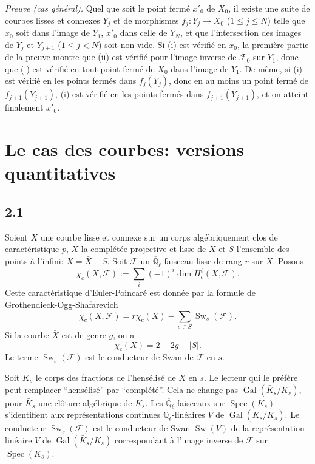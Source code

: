 \documentclass[11pt,a4paper]{article}
\theoremstyle{plain}
\theoremstyle{definition}
\DeclareMathOperator{\Spec}{Spec}
\DeclareMathOperator{\Gal}{Gal}
\DeclareMathOperator{\Sw}{Sw}
\begin{document}
\medskip
\noindent\textit{Preuve (cas g\'en\'eral).} Quel que soit le point ferm\'e $x'_0$ de $X_0$, il existe une suite de courbes lisses et connexes $Y_j$ et de morphismes $f_j: Y_j \to X_0$ ($1 \leq j \leq N$) telle que $x_0$ soit dans l'image de $Y_1$, $x'_0$ dans celle de $Y_N$, et que l'intersection des images de $Y_j$ et $Y_{j+1}$ ($1 \leq j < N$) soit non vide. Si (i) est v\'erifi\'e en $x_0$, la premi\`ere partie de la preuve montre que (ii) est v\'erifi\'e pour l'image inverse de $\mathcal{F}_0$ sur $Y_1$, donc que (i) est v\'erifi\'e en tout point ferm\'e de $X_0$ dans l'image de $Y_1$. De m\^eme, si (i) est v\'erifi\'e en les points ferm\'es dans $f_j(Y_j)$, donc en au moins un point ferm\'e de $f_{j+1}(Y_{j+1})$, (i) est v\'erifi\'e en les points ferm\'es dans $f_{j+1}(Y_{j+1})$, et on atteint finalement $x'_0$.


\section{Le cas des courbes: versions quantitatives}

\subsection*{2.1}

Soient $X$ une courbe lisse et connexe sur un corps alg\'ebriquement clos de caract\'eristique $p$, $\bar{X}$ la compl\'et\'ee projective et lisse de $X$ et $S$ l'ensemble des points \`a l'infini: $X = \bar{X} - S$. Soit $\mathcal{F}$ un $\overline{\mathbb{Q}}_\ell$-faisceau lisse de rang $r$ sur $X$. Posons
\[
\chi_c(X, \mathcal{F}) := \sum_i (-1)^i \dim H_c^i(X, \mathcal{F}).
\]
Cette caract\'eristique d'Euler-Poincar\'e est donn\'ee par la formule de Grothendieck-Ogg-Shafarevich
\begin{equation}\label{eq:2.1.1}
\chi_c(X, \mathcal{F}) = r\chi_c(X) - \sum_{s \in S} \Sw_s(\mathcal{F}).
\end{equation}
Si la courbe $\bar{X}$ est de genre $g$, on a
\begin{equation}\label{eq:2.1.2}
\chi_c(X) = 2 - 2g - |S|.
\end{equation}
Le terme $\Sw_s(\mathcal{F})$ est le conducteur de Swan de $\mathcal{F}$ en $s$.

Soit $K_s$ le corps des fractions de l'hens\'elis\'e de $X$ en $s$. Le lecteur qui le pr\'ef\`ere peut remplacer ``hens\'elis\'e'' par ``compl\'et\'e''. Cela ne change pas $\Gal(\bar{K}_s/K_s)$, pour $\bar{K}_s$ une cl\^oture alg\'ebrique de $K_s$. Les $\overline{\mathbb{Q}}_\ell$-faisceaux sur $\Spec(K_s)$ s'identifient aux repr\'esentations continues $\overline{\mathbb{Q}}_\ell$-lin\'eaires $V$ de $\Gal(\bar{K}_s/K_s)$. Le conducteur $\Sw_s(\mathcal{F})$ est le conducteur de Swan $\Sw(V)$ de la repr\'esentation lin\'eaire $V$ de $\Gal(\bar{K}_s/K_s)$ correspondant \`a l'image inverse de $\mathcal{F}$ sur $\Spec(K_s)$.
\end{document}
